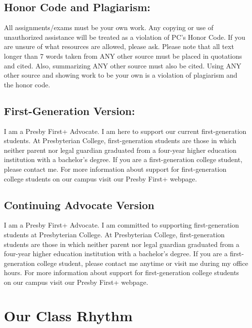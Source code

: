 \documentclass[
]{book}
\theoremstyle{definition}
\theoremstyle{definition}
\theoremstyle{definition}
\theoremstyle{definition}
\theoremstyle{remark}
\begin{document}
\hypertarget{honor-code-and-plagiarism}{%
\section{Honor Code and Plagiarism:}\label{honor-code-and-plagiarism}}

All assignments/exams must be your own work. Any copying or use of unauthorized assistance will be treated as a violation of PC's Honor Code. If you are unsure of what resources are allowed, please ask. Please note that all text longer than 7 words taken from ANY other source must be placed in quotations and cited. Also, summarizing ANY other source must also be cited. Using ANY other source and showing work to be your own is a violation of plagiarism and the honor code.

\hypertarget{first-generation-version}{%
\section{First-Generation Version:}\label{first-generation-version}}

I am a Presby First+ Advocate. I am here to support our current first-generation students. At Presbyterian College, first-generation students are those in which neither parent nor legal guardian graduated from a four-year higher education institution with a bachelor's degree. If you are a first-generation college student, please contact me. For more information about support for first-generation college students on our campus visit our Presby First+ webpage.

\hypertarget{continuing-advocate-version}{%
\section{Continuing Advocate Version}\label{continuing-advocate-version}}

I am a Presby First+ Advocate. I am committed to supporting first-generation students at Presbyterian College. At Presbyterian College, first-generation students are those in which neither parent nor legal guardian graduated from a four-year higher education institution with a bachelor's degree. If you are a first-generation college student, please contact me anytime or visit me during my office hours. For more information about support for first-generation college students on our campus visit our Presby First+ webpage.

\hypertarget{our-class-rhythm}{%
\chapter{Our Class Rhythm}\label{our-class-rhythm}}
\end{document}
